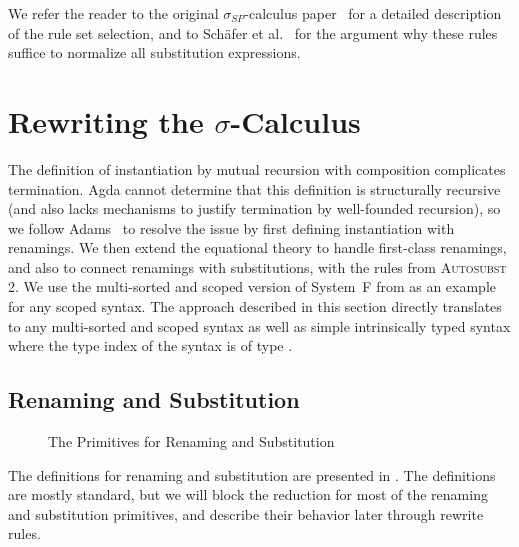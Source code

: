 \documentclass[a4paper,UKenglish,cleveref, autoref, thm-restate,anonymous]{lipics-v2021}
\begin{document}
We refer the reader to the original $σ_{SP}$-calculus
paper~\cite{10.1145/2676724.2693163} for a detailed description of the rule set
selection, and to Schäfer et al.~\cite{10.1145/2676724.2693163} for the
argument why these rules suffice to normalize all substitution expressions.

\section{Rewriting the $σ$-Calculus}\label{sec:mis}

The definition of instantiation by mutual recursion with composition
complicates termination. Agda cannot determine that this definition is
structurally recursive (and also lacks mechanisms to justify termination by
well-founded recursion), so we follow Adams~\cite{10.1007/11617990_1} to
resolve the issue by first defining instantiation with renamings. We then
extend the equational theory to handle first-class renamings, and also to
connect renamings with substitutions, with the rules from \textsc{Autosubst 2}.
We use the multi-sorted and scoped version of System~F from 
as an example for any scoped syntax. The approach described in this section
directly translates to any multi-sorted and scoped syntax as well as simple
intrinsically typed syntax where the type index of the syntax is of type
.

\subsection{Renaming and Substitution}\label{sec:mis-sub}
\begin{figure}[t]
      \AgdaNoSpaceAroundCode{}
      \setlength{\mathindent}{0pt}
      \setlength{\AgdaEmptySkip}{\smallskipamount}
      \begin{minipage}[t]{0.35\linewidth}
            \raggedright{}
            \ERen{}
      \end{minipage}
      \hfill
      \begin{minipage}[t]{0.53\linewidth}
            \raggedright{}
            \ESub{}
            \ESubT{}
      \end{minipage}
      \caption{The Primitives for Renaming and Substitution}\label{fig:mis-ras}
\end{figure}

The definitions for renaming and substitution are presented in
. The definitions are mostly standard, but we will block the
reduction for most of the renaming and substitution primitives, and describe
their behavior later through rewrite rules.
\end{document}
